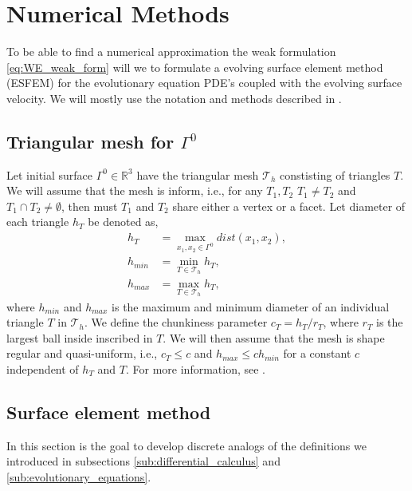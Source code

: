 
\section{Numerical Methods}%
\label{sec:numerical_methods}


 To be able to find a numerical approximation the weak formulation \eqref{eq:WE_weak_form} will we to formulate a evolving surface element method (ESFEM) for the evolutionary equation PDE's coupled with the evolving surface velocity. We will mostly
 use the notation and methods described in \cite{kovacs2021convergent, hu2022evolving}.

\subsection{ Triangular mesh for $\Gamma ^{0}$  }%
\label{sub:triangular_mesh}

Let initial surface $\Gamma ^{0} \in  \mathbb{R} ^3$ have the triangular mesh $\mathcal{T}_{h} $ constisting of triangles $T$. We will assume that the mesh is inform, i.e., for any $T_{1}, T_{2}$ $T_{1} \neq T_{2}$ and $T_{1} \cap T_{2} \neq \emptyset
$, then must $T_{1}$  and $T_{2}$ share either a vertex or a facet. Let diameter of each triangle $h_{T}$  be denoted as,
\[
    \begin{split}
    h_{T} & = \max_{x_{1}, x_{2} \in \Gamma ^{0}} dist(x_{1}, x_{2}), \\
h_{min} & = \min_{T \in \mathcal{T} _{h}} h_{T}, \\
h_{max} & = \max_{T \in \mathcal{T} _{h}} h_{T},
    \end{split}
\]
where $h_{min}$ and $h_{max}$ is the maximum and minimum diameter of an individual triangle $T$ in $\mathcal{T}_{h} $. We define the chunkiness parameter $c_{T} = h_{T}/r_{T}$, where $r_{T}$ is the largest ball inside inscribed in $T$. We will then
assume that the mesh is shape regular and quasi-uniform, i.e., $c_{T} \le c $ and $h_{max} \le c h_{min} $ for a  constant $c$ independent of $h_{T} $ and $T$.
For more information, see \cite{dziuk2007finite}.

\subsection{Surface element method}%
\label{sub:surface_element_method}
In this section is the goal to develop discrete analogs of the definitions we introduced in subsections \ref{sub:differential_calculus} and \ref{sub:evolutionary_equations}.


